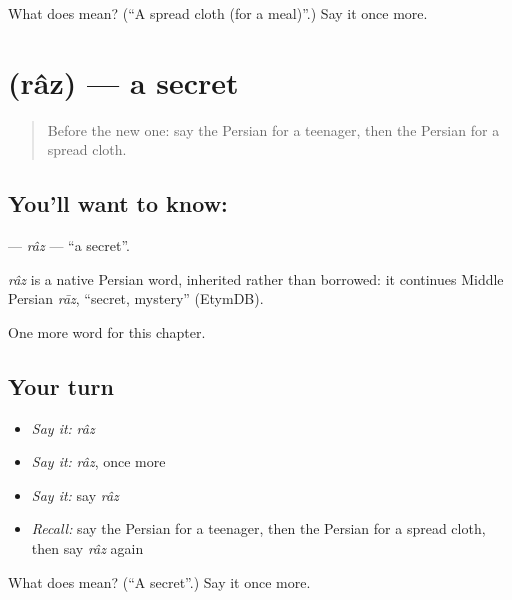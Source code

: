 \begin{tcolorbox}[breakable,colback=teal!4,colframe=teal!35!black,title={Before you move on}]
What does  mean? (\textquotedblleft{}A spread cloth (for a meal)\textquotedblright{}.) Say it once more.
\end{tcolorbox}
\section[\texorpdfstring{\fa{راز} (râz)}{راز (râz)}]{ (râz) — a secret}

\label{lesson:FA-C278-raz}



\begin{quote}
Before the new one: say the Persian for a teenager, then the Persian for a spread cloth.
\end{quote}

\subsection*{You'll want to know: }
\textbf{} — \emph{râz} — \textquotedblleft{}a secret\textquotedblright{}.

\begin{cousinweb}
\emph{râz} is a native Persian word, inherited rather than borrowed: it continues Middle Persian \emph{rāz}, \textquotedblleft{}secret, mystery\textquotedblright{} (EtymDB).
\end{cousinweb}

\begin{grammarlens}[title={What you've built}]
One more word for this chapter.
\end{grammarlens}

\subsection*{Your turn}
\begin{itemize}
\raggedright
  \item \emph{Say it:} \emph{râz}
  \item \emph{Say it:} \emph{râz}, once more
  \item \emph{Say it:} say \emph{râz}
  \item \emph{Recall:} say the Persian for a teenager, then the Persian for a spread cloth, then say \emph{râz} again
\end{itemize}

\begin{tcolorbox}[breakable,colback=teal!4,colframe=teal!35!black,title={Before you move on}]
What does  mean? (\textquotedblleft{}A secret\textquotedblright{}.) Say it once more.
\end{tcolorbox}
